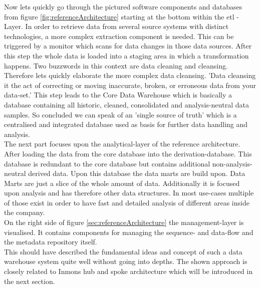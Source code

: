 Now lets quickly go through the pictured software components and databases from figure \ref{fig:referenceArchitecture} starting at the bottom within the \acrfull{etl} -Layer. In order to retrieve data from several source systems with distinct technologies, a more complex extraction component is needed. This can be triggered by a monitor which scans for data changes in those data sources.\newline
After this step the whole data is loaded into a staging area in which a transformation happens. Two buzzwords in this context are data cleaning and cleansing. Therefore lets quickly elaborate the more complex data cleansing. 
'Data cleansing it the act of correcting or moving inaccurate, broken, or erroneous data from your data-set.'\cite{dataCleansing}
This step leads to the Core Data Warehouse which is basically a database containing all historic, cleaned, consolidated and analysis-neutral data samples. So concluded we can speak of an 'single source of truth'\cite{scriptRasch} which is a centralised and integrated database used as basis for further data handling and analysis.\newline
\\
The next part focuses upon the analytical-layer of the reference architecture. After loading the data from the core database into the derivation-database. This database is redundant to the core database but contains additional non-analysis-neutral derived data. Upon this database the data marts are build upon. Data Marts are just a slice of the whole amount of data. Additionally it is focused upon analysis and has therefore other data structures. In most use-cases multiple of those exist in order to have fast and detailed analysis of different areas inside the company.\newline
\\
On the right side of figure \ref{sec:referenceArchitecture} the management-layer is visualised. It contains components for managing the sequence- and data-flow and the metadata repository itself.\newline
\\
This should have described the fundamental ideas and concept of such a data warehouse system quite well without going into depths. The shown approach is closely related to Inmons hub and spoke architecture which will be introduced in the next section. 
